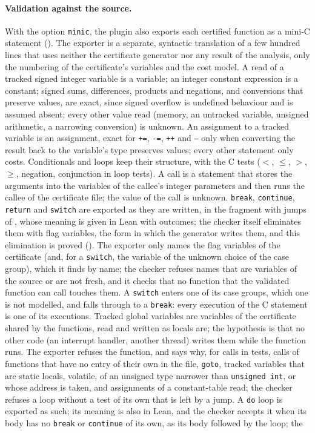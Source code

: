 \documentclass[oneside,english]{amsart}
\numberwithin{equation}{section}
\numberwithin{figure}{section}
\theoremstyle{plain}
\theoremstyle{definition}
\theoremstyle{plain}
\theoremstyle{remark}
\theoremstyle{plain}
\theoremstyle{definition}
\theoremstyle{plain}
\theoremstyle{remark}
\begin{document}
\paragraph{Validation against the source.}
With the option \texttt{minic}, the plugin also exports each certified function as a mini-C statement (\cite[Definition~\ref{I-def:minic}]{crosscheckTheory}). The exporter is a separate, syntactic translation of a few hundred lines that uses neither the certificate generator nor any result of the analysis, only the numbering of the certificate's variables and the cost model. A read of a tracked signed integer variable is a variable; an integer constant expression is a constant; signed sums, differences, products and negations, and conversions that preserve values, are exact, since signed overflow is undefined behaviour and is assumed absent; every other value read (memory, an untracked variable, unsigned arithmetic, a narrowing conversion) is unknown. An assignment to a tracked variable is an assignment, exact for \texttt{+=}, \texttt{-=}, \texttt{++} and \texttt{--} only when converting the result back to the variable's type preserves values; every other statement only costs. Conditionals and loops keep their structure, with the C tests ($<$, $\le$, $>$, $\ge$, negation, conjunction in loop tests). A call is a statement that stores the arguments into the variables of the callee's integer parameters and then runs the callee of the certificate file; the value of the call is unknown. \texttt{break}, \texttt{continue}, \texttt{return} and \texttt{switch} are exported as they are written, in the fragment with jumps of \cite[Definition~\ref{I-def:minic-jumps}]{crosscheckTheory}, whose meaning is given in Lean with outcomes; the checker itself eliminates them with flag variables, the form in which the generator writes them, and this elimination is proved (\cite[Theorem~\ref{I-thm:validated-jumps}]{crosscheckTheory}). The exporter only names the flag variables of the certificate (and, for a \texttt{switch}, the variable of the unknown choice of the case group), which it finds by name; the checker refuses names that are variables of the source or are not fresh, and it checks that no function that the validated function can call touches them. A \texttt{switch} enters one of its case groups, which one is not modelled, and falls through to a \texttt{break}: every execution of the C statement is one of its executions. Tracked global variables are variables of the certificate shared by the functions, read and written as locals are; the hypothesis is that no other code (an interrupt handler, another thread) writes them while the function runs. The exporter refuses the function, and says why, for calls in tests, calls of functions that have no entry of their own in the file, \texttt{goto}, tracked variables that are static locals, volatile, of an unsigned type narrower than \texttt{unsigned int}, or whose address is taken, and assignments of a constant-table read; the checker refuses a loop without a test of its own that is left by a jump. A \texttt{do} loop is exported as such; its meaning is also in Lean, and the checker accepts it when its body has no \texttt{break} or \texttt{continue} of its own, as its body followed by the loop; the 
\end{document}
